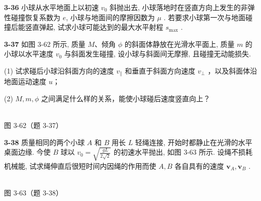 \textbf{3-36} 小球从水平地面上以初速 $v_{0}$ 斜抛出去, 小球落地时在竖直方向上发生的非弹性碰撞恢复系数为 $e$, 小球与地面间的摩擦因数为 $\mu$ . 若要求小球第一次与地面碰撞后能竖直弹起, 试求小球可能达到的最大水平射程 $s_{\max}$ .

\newpage

\textbf{3-37} 如图 3-62 所示, 质量 $M$、倾角 $\phi$ 的斜面体静放在光滑水平面上, 质量 $m$ 的小球以水平速度 $v_{0}$ 与斜面发生碰撞, 设小球与斜面间无摩擦, 且碰撞无动能损失.

(1) 试求碰后小球沿斜面方向的速度 $v_{\parallel}$ 和垂直于斜面方向速度 $v_{\perp}$ ，以及斜面体沿地面运动速度 $u$；

(2) $M, m, \phi$ 之间满足什么样的关系，能使小球碰后速度竖直向上？

\begin{center}
\resizebox{0.50\textwidth}{!}{}\\[4pt]
{\small 图 3-62（题 3-37）}
\end{center}

\newpage

\textbf{3-38} 质量相同的两个小球 $A$ 和 $B$ 用长 $L$ 轻绳连接, 开始时都静止在光滑的水平桌面边缘. 今使 $B$ 球以 $v_{0} = \sqrt{\frac{gL}{2\sqrt{2}}}$ 的初速水平抛出, 如图 3-63 所示. 设绳不损耗机械能, 试求绳伸直后很短时间内因绳的作用而使 $A, B$ 各自具有的速度 $\pmb{v}_{A}, \pmb{v}_{B}$ .

\begin{center}
\resizebox{0.42\textwidth}{!}{}\\[4pt]
{\small 图 3-63（题 3-38）}
\end{center}
